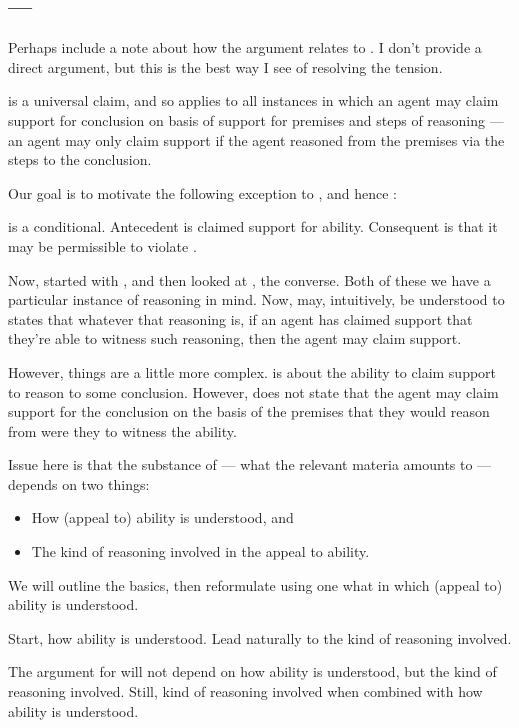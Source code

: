 \subsection{\EAS{-} --- \EAS{}}
\label{sec:eas}

{
  \color{red}
  Perhaps include a note about how the argument relates to \EAS{}.
  I don't provide a direct argument, but this is the best way I see of resolving the tension.
}

\begin{note}[Alternative]
  \ESU{} is a universal claim, and so applies to all instances in which an agent may claim support for conclusion on basis of support for premises and steps of reasoning --- an agent may only claim support if the agent reasoned from the premises via the steps to the conclusion.

  Our goal is to motivate the following exception to \gESU{}, and hence \ESU{}:

  \goalEAS*
\end{note}

\begin{note}
  \EAS{} is a conditional.
  Antecedent is claimed support for ability.
  Consequent is that it may be permissible to violate \gESU{}.
\end{note}

\begin{note}
  Now, started with \USE{}, and then looked at \ESU{}, the converse.
  Both of these we have a particular instance of reasoning in mind.
  Now, \EAS{} may, intuitively, be understood to states that whatever that reasoning is, if an agent has claimed support that they're able to witness such reasoning, then the agent may claim support.

  However, things are a little more complex.
  \EAS{} is about the ability to claim support to reason to some conclusion.
  However, \EAS{} does not state that the agent may claim support for the conclusion on the basis of the premises that they would reason from were they to witness the ability.

  Issue here is that the substance of \EAS{} --- what the relevant materia amounts to --- depends on two things:
  \begin{itemize}
  \item How (appeal to) ability is understood, and
  \item The kind of reasoning involved in the appeal to ability.
  \end{itemize}

  We will outline the basics, then reformulate \EAS{} using one what in which (appeal to) ability is understood.

  Start, how ability is understood.
  Lead naturally to the kind of reasoning involved.

  The argument for \EAS{} will not depend on how ability is understood, but the kind of reasoning involved.
  Still, kind of reasoning involved when combined with how ability is understood.
\end{note}

